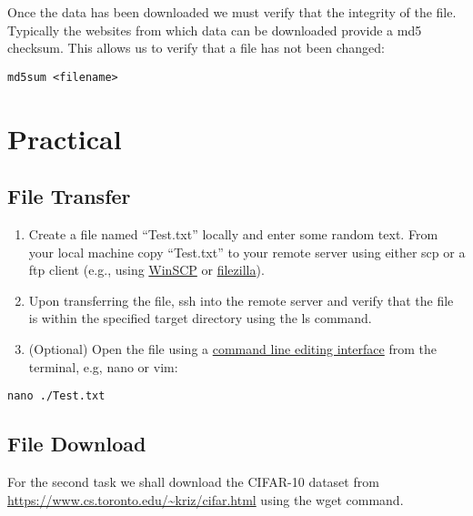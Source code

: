\documentclass[
]{book}
\providecommand{\tightlist}{%
  \setlength{\itemsep}{0pt}\setlength{\parskip}{0pt}}
\begin{document}
Once the data has been downloaded we must verify that the integrity of the file.
Typically the websites from which data can be downloaded provide a md5 checksum.
This allows us to verify that a file has not been changed:

\begin{verbatim}
md5sum <filename>
\end{verbatim}

\hypertarget{practical-1}{%
\section{Practical}\label{practical-1}}

\hypertarget{file-transfer-1}{%
\subsection{File Transfer}\label{file-transfer-1}}

\begin{enumerate}
\def\labelenumi{\arabic{enumi})}
\tightlist
\item
  Create a file named ``Test.txt'' locally and enter some random text.
  From your local machine copy ``Test.txt'' to your remote server using either
  scp or a ftp client (e.g., using \href{https://winscp.net/eng/index.php}{WinSCP}
  or \href{https://filezilla-project.org/}{filezilla}).
\item
  Upon transferring the file, ssh into the remote server and verify that the file is within the
  specified target directory using the ls command.
\item
  (Optional) Open the file using a
  \href{https://en.wikipedia.org/wiki/List_of_text_editors}{command line editing interface} from the terminal, e.g, nano or vim:
\end{enumerate}

\begin{verbatim}
nano ./Test.txt
\end{verbatim}

\hypertarget{file-download-1}{%
\subsection{File Download}\label{file-download-1}}

For the second task we shall download the CIFAR-10 dataset from
\url{https://www.cs.toronto.edu/~kriz/cifar.html}
using the wget command.
\end{document}
